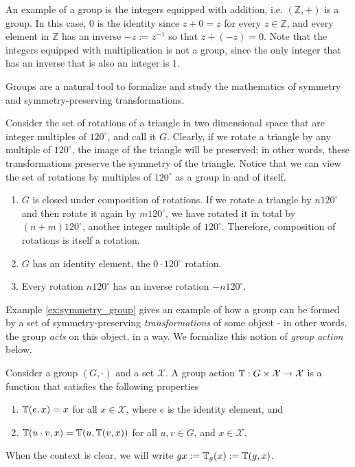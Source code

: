 \begin{example}
An example of a group is the integers equipped with addition, i.e. $(\mathbb{Z}, +)$ is a group.
In this case, $0$ is the identity since $z + 0 = z$ for every $z \in \mathbb{Z}$, and every element in $\mathbb{Z}$ has an inverse $-z := z^{-1}$ so that $z + (-z) = 0$.
Note that the integers equipped with multiplication is not a group, since the only integer that has an inverse that is also an integer is $1$.
\end{example}

\noindent
Groups are a natural tool to formalize and study the mathematics of symmetry and symmetry-preserving transformations.

\begin{example} \label{ex:symmetry_group}
	Consider the set of rotations of a triangle in two dimensional space that are integer multiples of $120^{\circ}$, and call it $G$.
	Clearly, if we rotate a triangle by any multiple of $120^{\circ}$, the image of the triangle will be preserved; in other words, these transformations preserve the symmetry of the triangle.
	Notice that we can view the set of rotations by multiples of $120^{\circ}$ as a group in and of itself.
	\begin{enumerate}
	\item $G$ is closed under composition of rotations. 
	If we rotate a triangle by $n120^{\circ}$ and then rotate it again by $m120^{\circ}$, we have rotated it in total by $(n+m)120^{\circ}$, another integer multiple of $120^{\circ}$.
	Therefore, composition of rotations is itself a rotation.
	
	\item $G$ has an identity element, the $0 \cdot 120^{\circ}$ rotation.
	
	\item Every rotation $n120^{\circ}$ has an inverse rotation $-n120^{\circ}$.
	\end{enumerate}
\end{example}

\noindent
Example \ref{ex:symmetry_group} gives an example of how a group can be formed by a set of symmetry-preserving \textit{transformations} of some object - in other words, the group \textit{acts} on this object, in a way.
We formalize this notion of \textit{group action} below.

\begin{definition} \label{def:group_action}
	Consider a group $(G,\cdot)$ and a set $\mathcal{X}$.
	A group action $\mathbb{T} : G \times \mathcal{X} \to \mathcal{X}$ is a function that satisfies the following properties
	\begin{enumerate}
	\item
	$\mathbb{T}(e,x) = x$ for all $x \in \mathcal{X}$, where $e$ is the identity element, and
	\item
	$\mathbb{T}(u \cdot v,x) = \mathbb{T}(u, \mathbb{T}(v,x))$ for all $u,v \in G$, and $x \in \mathcal{X}$.
	\end{enumerate}
	When the context is clear, we will write $g x := \mathbb{T}_g(x) := \mathbb{T}(g,x)$.
\end{definition}

